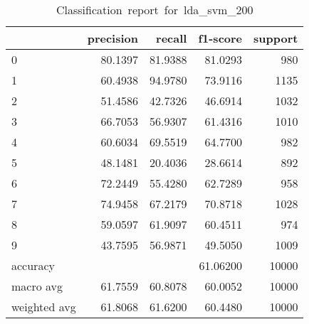 \begin{table}[htb!]
    \centering
    \begin{tabular}{lrrrr}
        \toprule
                     & precision & recall  & f1-score & support \\
        \midrule
        0            & 80.1397   & 81.9388 & 81.0293  & 980     \\
        1            & 60.4938   & 94.9780 & 73.9116  & 1135    \\
        2            & 51.4586   & 42.7326 & 46.6914  & 1032    \\
        3            & 66.7053   & 56.9307 & 61.4316  & 1010    \\
        4            & 60.6034   & 69.5519 & 64.7700  & 982     \\
        5            & 48.1481   & 20.4036 & 28.6614  & 892     \\
        6            & 72.2449   & 55.4280 & 62.7289  & 958     \\
        7            & 74.9458   & 67.2179 & 70.8718  & 1028    \\
        8            & 59.0597   & 61.9097 & 60.4511  & 974     \\
        9            & 43.7595   & 56.9871 & 49.5050  & 1009    \\
        accuracy     &           &         & 61.06200 & 10000   \\
        macro avg    & 61.7559   & 60.8078 & 60.0052  & 10000   \\
        weighted avg & 61.8068   & 61.6200 & 60.4480  & 10000   \\
        \bottomrule
    \end{tabular}
    \caption{Classification\ report\ for\ lda\_svm\_200}
    \label{tab:classification-report-lda_svm_200}
\end{table}
